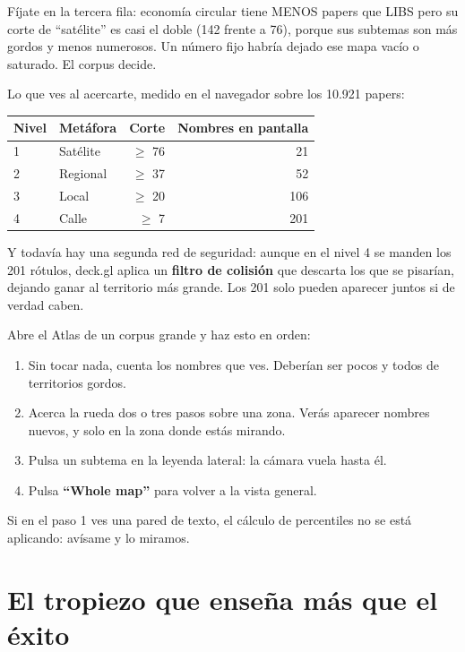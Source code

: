 \documentclass[11pt,a4paper]{article}
\begin{document}
Fíjate en la tercera fila: economía circular tiene MENOS papers que LIBS pero su corte de
``satélite'' es casi el doble (142 frente a 76), porque sus subtemas son más gordos y
menos numerosos. Un número fijo habría dejado ese mapa vacío o saturado. El corpus decide.

Lo que ves al acercarte, medido en el navegador sobre los 10.921 papers:

\begin{center}
\begin{tabular}{llrr}
\hline
Nivel & Metáfora & Corte & Nombres en pantalla \\
\hline
1 & Satélite & $\geq$ 76 & 21 \\
2 & Regional & $\geq$ 37 & 52 \\
3 & Local    & $\geq$ 20 & 106 \\
4 & Calle    & $\geq$ 7  & 201 \\
\hline
\end{tabular}
\end{center}

Y todavía hay una segunda red de seguridad: aunque en el nivel 4 se manden los 201
rótulos, deck.gl aplica un \textbf{filtro de colisión} que descarta los que se pisarían,
dejando ganar al territorio más grande. Los 201 solo pueden aparecer juntos si de verdad
caben.

\begin{practica}
Abre el Atlas de un corpus grande y haz esto en orden:
\begin{enumerate}
  \item Sin tocar nada, cuenta los nombres que ves. Deberían ser pocos y todos de
        territorios gordos.
  \item Acerca la rueda dos o tres pasos sobre una zona. Verás aparecer nombres nuevos,
        y solo en la zona donde estás mirando.
  \item Pulsa un subtema en la leyenda lateral: la cámara vuela hasta él.
  \item Pulsa \textbf{``Whole map''} para volver a la vista general.
\end{enumerate}
Si en el paso 1 ves una pared de texto, el cálculo de percentiles no se está aplicando:
avísame y lo miramos.
\end{practica}

\section{El tropiezo que enseña más que el éxito}
\end{document}
